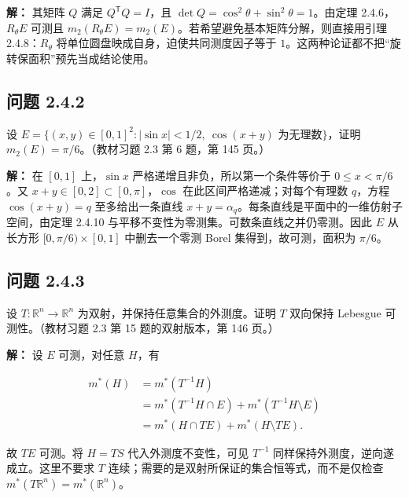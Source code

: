 \documentclass[11pt,a4paper]{article}
\begin{document}
\textbf{解：} 其矩阵 \(Q\) 满足 \(Q^{\mathsf T}Q=I\)，且
\(\det Q=\cos^2\theta+\sin^2\theta=1\)。由定理 2.4.6，\(R_\theta E\)
可测且 \(m_2(R_\theta E)=m_2(E)\)。若希望避免基本矩阵分解，则直接用引理
2.4.8：\(R_\theta\) 将单位圆盘映成自身，迫使共同测度因子等于
\(1\)。这两种论证都不把``旋转保面积''预先当成结论使用。

\subsection{问题 2.4.2}\label{ux95eeux9898-2.4.2}

设
\(E=\{(x,y)\in[0,1]^2:|\sin x|<1/2,\ \cos(x+y)\text{ 为无理数}\}\)，证明
\(m_2(E)=\pi/6\)。（教材习题 2.3 第 6 题，第 145 页。）

\textbf{解：} 在 \([0,1]\) 上，\(\sin x\)
严格递增且非负，所以第一个条件等价于 \(0\le x<\pi/6\)。又
\(x+y\in[0,2]\subset[0,\pi]\)，\(\cos\) 在此区间严格递减；对每个有理数
\(q\)，方程 \(\cos(x+y)=q\) 至多给出一条直线
\(x+y=\alpha_q\)。每条直线是平面中的一维仿射子空间，由定理 2.4.10
与平移不变性为零测集。可数条直线之并仍零测。因此 \(E\) 从长方形
\([0,\pi/6)\times[0,1]\) 中删去一个零测 Borel 集得到，故可测，面积为
\(\pi/6\)。

\subsection{问题 2.4.3}\label{ux95eeux9898-2.4.3}

设 \(T:\mathbb R^n\to\mathbb R^n\) 为双射，并保持任意集合的外测度。证明
\(T\) 双向保持 Lebesgue 可测性。（教材习题 2.3 第 15 题的双射版本，第
146 页。）

\textbf{解：} 设 \(E\) 可测，对任意 \(H\)，有

\begin{equation*}
\begin{aligned}
m^*(H)&=m^*(T^{-1}H)\\
&=m^*(T^{-1}H\cap E)+m^*(T^{-1}H\setminus E)\\
&=m^*(H\cap TE)+m^*(H\setminus TE).
\end{aligned}
\end{equation*}

故 \(TE\) 可测。将 \(H=TS\) 代入外测度不变性，可见 \(T^{-1}\)
同样保持外测度，逆向遂成立。这里不要求 \(T\)
连续；需要的是双射所保证的集合恒等式，而不是仅检查
\(m^*(T\mathbb R^n)=m^*(\mathbb R^n)\)。
\end{document}
